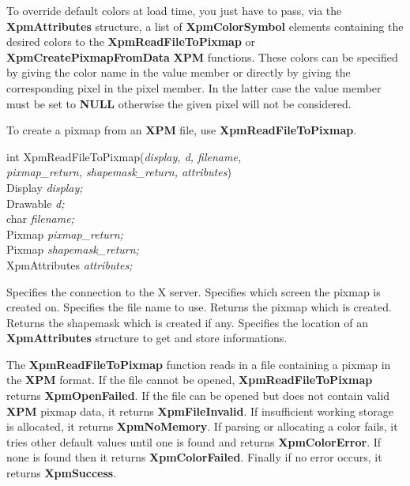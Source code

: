 To override default colors at load time, you just have to pass, via the {\bf
XpmAttributes} structure, a list of {\bf XpmColorSymbol} elements containing
the desired colors to the {\bf XpmReadFileToPixmap} or {\bf
XpmCreatePixmapFromData} {\bf XPM} functions. These colors can be specified by
giving the color name in the value member or directly by giving the
corresponding pixel in the pixel member. In the latter case the value member
must be set to {\bf NULL} otherwise the given pixel will not be considered.

\vspace{.5cm}
To create a pixmap from an {\bf XPM} file, use {\bf XpmReadFileToPixmap}.

\begin{flushleft} 

int XpmReadFileToPixmap({\it display, d, filename, \\
\hspace{3cm}pixmap\_return, shapemask\_return, attributes})\\

\hspace{1cm}Display {\it *display;}\\
\hspace{1cm}Drawable {\it d;}\\
\hspace{1cm}char {\it *filename;}\\
\hspace{1cm}Pixmap {\it *pixmap\_return;}\\
\hspace{1cm}Pixmap {\it *shapemask\_return;}\\
\hspace{1cm}XpmAttributes {\it *attributes;}

\end{flushleft}

\begin{description}

 Specifies the connection to the X server.
 Specifies which screen the pixmap is created on.
 Specifies the file name to use.
 Returns the pixmap which is created.
 Returns the shapemask which is created if any.
 Specifies the location of an {\bf XpmAttributes} structure
to get and store informations.

\end{description} 

The {\bf XpmReadFileToPixmap} function reads in a file containing a pixmap in
the {\bf XPM} format. If the file cannot be opened, {\bf XpmReadFileToPixmap}
returns {\bf XpmOpenFailed}. If the file can be opened but does not
contain valid {\bf XPM} pixmap data, it returns {\bf XpmFileInvalid}. If
insufficient working storage is allocated, it returns {\bf XpmNoMemory}.
If parsing or allocating a color fails, it tries other default values until
one is found and returns {\bf XpmColorError}. If none is found then it
returns {\bf XpmColorFailed}. Finally if no error occurs, it returns
{\bf XpmSuccess}.

